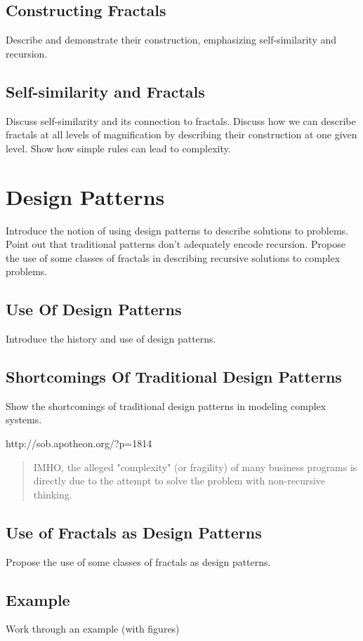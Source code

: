 \documentclass[jou,apacite]{apa6}
\begin{document}
\subsection{Constructing Fractals}
Describe and demonstrate their construction, emphasizing self-similarity and recursion.

\subsection{Self-similarity and Fractals}
Discuss self-similarity and its connection to fractals.  Discuss how we can describe fractals at all levels of magnification by describing their construction at one given level.  Show how simple rules can lead to complexity.

\section{Design Patterns}  %
Introduce the notion of using design patterns to describe solutions to problems.  Point out that traditional patterns don't adequately encode recursion.  Propose the use of some classes of fractals in describing recursive solutions to complex problems.
\subsection{Use Of Design Patterns}
Introduce the history and use of design patterns.~\cite{Gamma}

\subsection{Shortcomings Of Traditional Design Patterns}
Show the shortcomings of traditional design patterns in modeling complex systems.

http://sob.apotheon.org/?p=1814

\begin{quote}
IMHO, the alleged "complexity" (or fragility) of many business programs is directly due to the attempt to solve the problem with non-recursive thinking.
\end{quote}

\subsection{Use of Fractals as Design Patterns}
Propose the use of some classes of fractals as design patterns.

\subsection{Example}
Work through an example (with figures)
\end{document}
